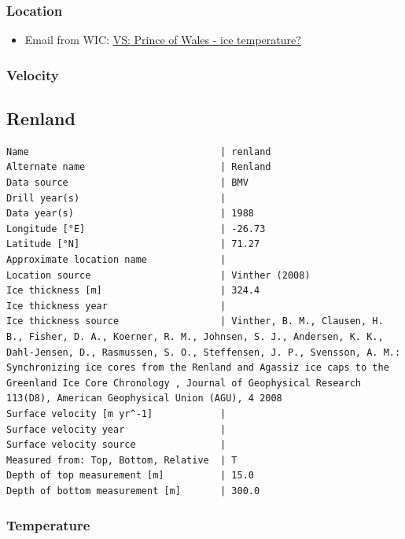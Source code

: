 \documentclass[article,a4paper,times,11pt,twoside]{article}
\begin{document}
\subsubsection{Location}
\label{sec:org0195e8b}

\begin{itemize}
\item Email from WIC: \href{msgid:AM0PR04MB61293648564AB69ACA6A02CBA2F30@AM0PR04MB6129.eurprd04.prod.outlook.com}{VS: Prince of Wales - ice temperature?}
\end{itemize}

\subsubsection{Velocity}
\label{sec:orgf3bc46c}
\clearpage
\subsection{Renland}
\label{sec:org14c9cb6}
\begin{verbatim}
Name                                  | renland
Alternate name                        | Renland
Data source                           | BMV
Drill year(s)                         | 
Data year(s)                          | 1988
Longitude [°E]                        | -26.73
Latitude [°N]                         | 71.27
Approximate location name             | 
Location source                       | Vinther (2008)
Ice thickness [m]                     | 324.4
Ice thickness year                    | 
Ice thickness source                  | Vinther, B. M., Clausen, H. B., Fisher, D. A., Koerner, R. M., Johnsen, S. J., Andersen, K. K., Dahl-Jensen, D., Rasmussen, S. O., Steffensen, J. P., Svensson, A. M.: Synchronizing ice cores from the Renland and Agassiz ice caps to the Greenland Ice Core Chronology , Journal of Geophysical Research 113(D8), American Geophysical Union (AGU), 4 2008 
Surface velocity [m yr^-1]            | 
Surface velocity year                 | 
Surface velocity source               | 
Measured from: Top, Bottom, Relative  | T
Depth of top measurement [m]          | 15.0
Depth of bottom measurement [m]       | 300.0
\end{verbatim}

\subsubsection{Temperature}
\label{sec:org0deee39}
\end{document}
